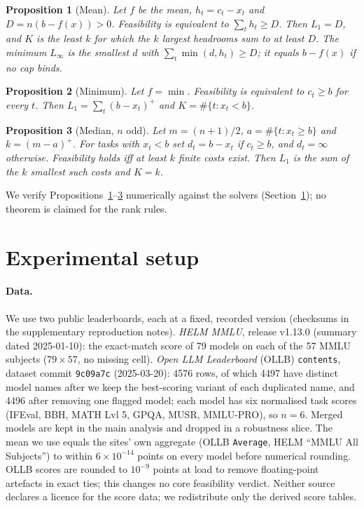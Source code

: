 \documentclass{article}
\newtheorem{proposition}{Proposition}
\begin{document}
\begin{proposition}[Mean]\label{prop:mean}
Let $f$ be the mean, $h_t=c_t-x_t$ and $D=n(b-f(x))>0$. Feasibility is equivalent to $\sum_t h_t\ge D$. Then $L_1=D$, and $K$ is the least $k$ for which the $k$ largest headrooms sum to at least $D$. The minimum $L_\infty$ is the smallest $d$ with $\sum_t\min(d,h_t)\ge D$; it equals $b-f(x)$ if no cap binds.
\end{proposition}
\begin{proposition}[Minimum]\label{prop:min}
Let $f=\min$. Feasibility is equivalent to $c_t\ge b$ for every $t$. Then $L_1=\sum_t(b-x_t)^+$ and $K=\#\{t:x_t<b\}$.
\end{proposition}
\begin{proposition}[Median, $n$ odd]\label{prop:median}
Let $m=(n+1)/2$, $a=\#\{t:x_t\ge b\}$ and $k=(m-a)^+$. For tasks with $x_t<b$ set $d_t=b-x_t$ if $c_t\ge b$, and $d_t=\infty$ otherwise. Feasibility holds iff at least $k$ finite costs exist. Then $L_1$ is the sum of the $k$ smallest such costs and $K=k$.
\end{proposition}
We verify Propositions~\ref{prop:mean}--\ref{prop:median} numerically against the solvers (Section~\ref{sec:exp}); no theorem is claimed for the rank rules.

\section{Experimental setup}
\label{sec:exp}
\paragraph{Data.}
We use two public leaderboards, each at a fixed, recorded version (checksums in the supplementary reproduction notes). \emph{HELM MMLU}, release v1.13.0 (summary dated 2025-01-10): the exact-match score of 79 models on each of the 57 MMLU subjects ($79\times57$, no missing cell). \emph{Open LLM Leaderboard} (OLLB) \texttt{contents}, dataset commit \texttt{9c09a7c} (2025-03-20): 4576 rows, of which 4497 have distinct model names after we keep the best-scoring variant of each duplicated name, and 4496 after removing one flagged model; each model has six normalised task scores (IFEval, BBH, MATH Lvl 5, GPQA, MUSR, MMLU-PRO), so $n=6$. Merged models are kept in the main analysis and dropped in a robustness slice. The mean we use equals the sites' own aggregate (OLLB \texttt{Average}, HELM ``MMLU All Subjects'') to within $6\times10^{-14}$ points on every model before numerical rounding. OLLB scores are rounded to $10^{-9}$ points at load to remove floating-point artefacts in exact ties; this changes no core feasibility verdict. Neither source declares a licence for the score data; we redistribute only the derived score tables.
\end{document}
